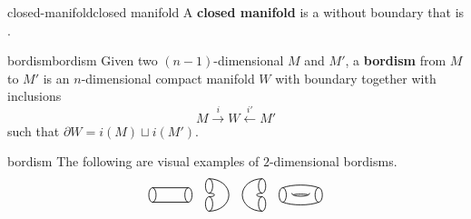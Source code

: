 \begin{topic}{closed-manifold}{closed manifold}
    A \textbf{closed manifold} is a  without boundary that is .
\end{topic}

\begin{topic}{bordism}{bordism}
    Given two $(n - 1)$-dimensional   $M$ and $M'$, a \textbf{bordism} from $M$ to $M'$ is an $n$-dimensional compact manifold $W$ with boundary together with inclusions
    \[ M \xrightarrow{i} W \xleftarrow{i'} M' \]
    such that $\partial W = i(M) \sqcup i(M')$.
\end{topic}

\begin{example}{bordism}
    The following are visual examples of $2$-dimensional bordisms.
    \[  \begin{tikzpicture}[semithick, scale=0.5, baseline=-0.5ex] \begin{scope} \draw (-1,0) ellipse (0.2cm and 0.4cm); \draw (-1,0.4) -- (1,0.4); \draw (-1,-0.4) -- (1,-0.4); \draw (1,0) ellipse (0.2cm and 0.4cm); \end{scope} \end{tikzpicture}
        \quad
        \begin{tikzpicture}[semithick, scale=0.5, baseline=-0.5ex] \begin{scope} \draw (0,0.5) ellipse (0.2cm and 0.4cm); \draw (0,-0.5) ellipse (0.2cm and 0.4cm); \draw (0,0.9) arc (90:-90:1.1cm and 0.9cm); \draw (0,0.1) arc (90:-90:0.3cm and 0.1cm); \end{scope} \end{tikzpicture}
        \quad
        \begin{tikzpicture}[semithick, scale=0.5, baseline=-0.5ex] \begin{scope} \draw (0,0.5) ellipse (0.2cm and 0.4cm);\draw (0,-0.5) ellipse (0.2cm and 0.4cm); \draw (0,0.9) arc (90:270:1.1cm and 0.9cm); \draw (0,0.1) arc (90:270:0.3cm and 0.1cm); \end{scope} \end{tikzpicture}
        \quad
        \begin{tikzpicture}[semithick, scale=0.5, baseline=-0.5ex] \begin{scope} \draw (-1,0) ellipse (0.2cm and 0.4cm); \draw (-1,0.4) .. controls (-0.5,0.6) and (0.5,0.6) .. (1,0.4); \draw (-1,-0.4) .. controls (-0.5,-0.6) and (0.5,-0.6) .. (1,-0.4); \draw (-0.5,0.1) .. controls (-0.5,-0.125) and (0.5,-0.125) .. (0.5,0.1); \draw (-0.4,0.0) .. controls (-0.4,0.0625) and (0.4,0.0625) .. (0.4,0.0); \draw (1,0) ellipse (0.2cm and 0.4cm); \end{scope} \end{tikzpicture}
\]
\end{example}
